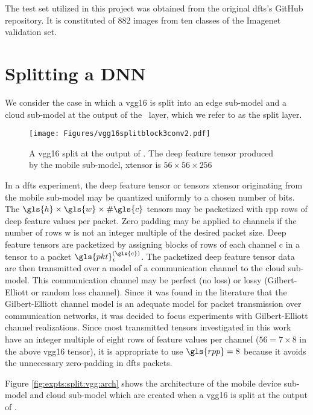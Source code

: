 The test set utilized in this project was obtained from the original \gls{dfts}'s GitHub repository. It is constituted of 882 images from ten classes of the Imagenet validation set.

\section{Splitting a DNN} \label{sec:expts:dnn}
We consider the case in which a \gls{vgg16} is split into an edge sub-model and a cloud sub-model at the output of the \vggblock~layer, which we refer to as the split layer.

\begin{figure}[H]
	\centering
	\texttt{[image: Figures/vgg16splitblock3conv2.pdf]}
	\caption[VGG16 split layer]{A \gls{vgg16} split at the output of \vggblock. The deep feature tensor produced by the mobile sub-model, \gls{xtensor} is $56 \times 56 \times 256$}
	\label{fig:expts:split:vgg}
\end{figure}

In a \gls{dfts} experiment, the deep feature tensor or tensors \gls{xtensor} originating from the mobile sub-model may be quantized uniformly to a chosen number of bits. The $\gls{h} \times \gls{w} \times \text{\#}\gls{c}$ tensors may be packetized with \gls{rpp} rows of deep feature values per packet. Zero padding may be applied to channels if the number of rows \gls{w} is not an integer multiple of the desired packet size. Deep feature tensors are packetized by assigning blocks of rows of each channel \gls{c} in a tensor to a packet $\gls{pkt}_i^{(\gls{c})}$. The packetized deep feature tensor data are then transmitted over a model of a communication channel to the cloud sub-model. This communication channel may be perfect (no loss) or lossy (Gilbert-Elliott or random loss channel). Since it was found in the literature that the Gilbert-Elliott channel model is an adequate model for packet transmission over communication networks, it was decided to focus experiments with Gilbert-Elliott channel realizations. Since most transmitted tensors investigated in this work have an integer multiple of eight rows of feature values per channel ($56 = 7 \times 8$ in the above \gls{vgg16} tensor), it is appropriate to use $\gls{rpp} = 8$ because it avoids the unnecessary zero-padding in \gls{dfts} packets.

Figure \ref{fig:expts:split:vgg:arch} shows the architecture of the mobile device sub-model and cloud sub-model which are created when a \gls{vgg16} is split at the output of \vggblock.

